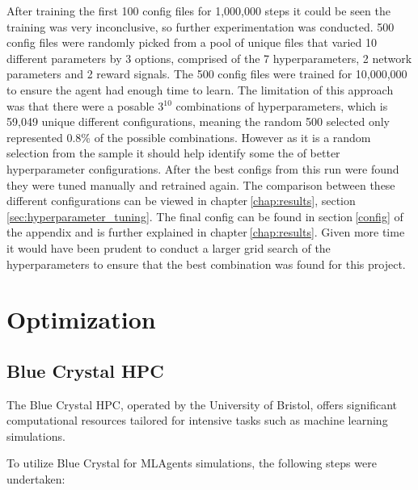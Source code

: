 After training the first 100 config files for 1,000,000 steps it could be seen the training was very inconclusive, so further experimentation was conducted. 500 config files were randomly picked from a pool of unique files that varied 10 different parameters by 3 options, comprised of the 7 hyperparameters, 2 network parameters and 2 reward signals. The 500 config files were trained for 10,000,000 to ensure the agent had enough time to learn. The limitation of this approach was that there were a posable 3$^{10}$ combinations of hyperparameters, which is 59,049 unique different configurations, meaning the random 500 selected only represented 0.8\% of the possible combinations. However as it is a random selection from the sample it should help identify some the of better hyperparameter configurations. After the best configs from this run were found they were tuned manually and retrained again. 
The comparison between these different configurations can be viewed in chapter$~$\ref{chap:results}, section$~$\ref{sec:hyperparameter_tuning}. The final config can be found in section$~$\ref{config} of the appendix and is further explained in chapter$~$\ref{chap:results}. Given more time it would have been prudent to conduct a larger grid search of the hyperparameters to ensure that the best combination was found for this project.


\section{Optimization}


\subsection{Blue Crystal HPC}

The Blue Crystal HPC, operated by the University of Bristol, offers significant computational resources tailored for intensive tasks such as machine learning simulations. 

To utilize Blue Crystal for MLAgents simulations, the following steps were undertaken:

